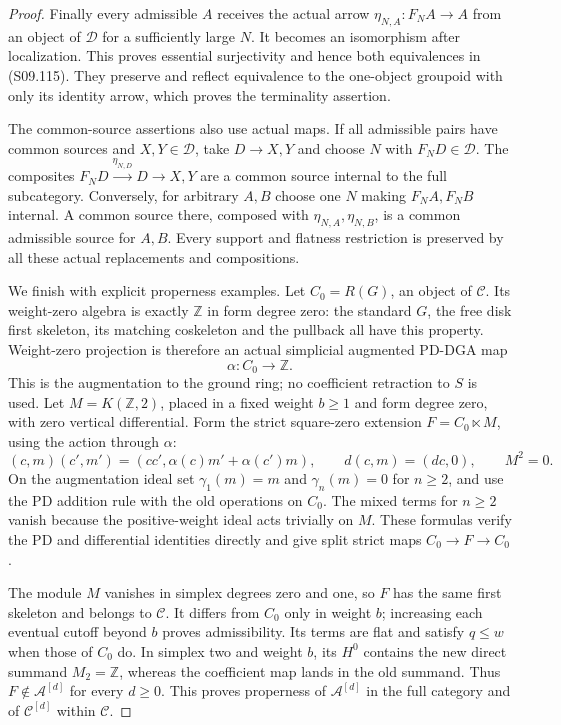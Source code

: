 \begin{proof}
Finally every admissible $A$ receives the actual arrow
$\eta_{N,A}:F_NA\to A$ from an object of $\mathcal D$ for a
sufficiently large $N$.  It becomes an isomorphism after
localization.  This proves essential surjectivity and hence
both equivalences in (S09.115).  They preserve and reflect
equivalence to the one-object groupoid with only its identity
arrow, which proves the terminality assertion.

The common-source assertions also use actual maps.  If all
admissible pairs have common sources and $X,Y\in\mathcal D$,
take $D\to X,Y$ and choose $N$ with $F_ND\in\mathcal D$.
The composites
$F_ND\xrightarrow{\eta_{N,D}}D\to X,Y$
are a common source internal to the full subcategory.
Conversely, for arbitrary $A,B$ choose one $N$ making
$F_NA,F_NB$ internal.  A common source there, composed with
$\eta_{N,A},\eta_{N,B}$, is a common admissible source for
$A,B$.  Every support and flatness restriction is preserved
by all these actual replacements and compositions.

We finish with explicit properness examples.  Let $C_0=R(G)$,
an object of $\mathcal C$.  Its weight-zero algebra is exactly
$\mathbb Z$ in form degree zero: the standard $G$, the free
disk first skeleton, its matching coskeleton and the pullback
all have this property.  Weight-zero projection is therefore
an actual simplicial augmented PD-DGA map
\[
                              \alpha:C_0\longrightarrow\mathbb Z.
 \tag{S09.123}
\]
This is the augmentation to the ground ring; no coefficient
retraction to $S$ is used.
Let $M=K(\mathbb Z,2)$, placed in a fixed weight $b\geq1$
and form degree zero, with zero vertical differential.
Form the strict square-zero extension $F=C_0\ltimes M$,
using the action through $\alpha$:
\[
 (c,m)(c',m')=(cc',\alpha(c)m'+\alpha(c')m),\qquad
 d(c,m)=(dc,0),\qquad M^2=0.
 \tag{S09.124}
\]
On the augmentation ideal set $\gamma_1(m)=m$ and
$\gamma_n(m)=0$ for $n\geq2$, and use the PD addition rule
with the old operations on $C_0$.  The mixed terms for
$n\geq2$ vanish because the positive-weight ideal acts
trivially on $M$.  These formulas verify the PD and
differential identities directly and give split strict maps
$C_0\to F\to C_0$.

The module $M$ vanishes in simplex degrees zero and one,
so $F$ has the same first skeleton and belongs to
$\mathcal C$.  It differs from $C_0$ only in weight $b$;
increasing each eventual cutoff beyond $b$ proves
admissibility.  Its terms are flat and satisfy $q\leq w$
when those of $C_0$ do.  In simplex two and weight $b$,
its $H^0$ contains the new direct summand $M_2=\mathbb Z$,
whereas the coefficient map lands in the old summand.
Thus $F\notin\mathcal A^{[d]}$ for every $d\geq0$.
This proves properness of $\mathcal A^{[d]}$ in the full
category and of $\mathcal C^{[d]}$ within $\mathcal C$.


\end{proof}
